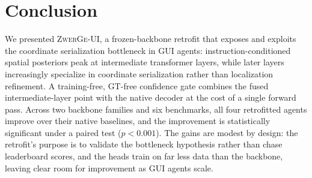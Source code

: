 \section{Conclusion}

We presented \textsc{ZwerGe-UI}, a frozen-backbone retrofit that exposes and exploits the coordinate serialization bottleneck in GUI agents: instruction-conditioned spatial posteriors peak at intermediate transformer layers, while later layers increasingly specialize in coordinate serialization rather than localization refinement.
A training-free, GT-free confidence gate combines the fused intermediate-layer point with the native decoder at the cost of a single forward pass.
Across two backbone families and six benchmarks, all four retrofitted agents improve over their native baselines, and the improvement is statistically significant under a paired test ($p{<}0.001$).
The gains are modest by design: the retrofit's purpose is to validate the bottleneck hypothesis rather than chase leaderboard scores, and the heads train on far less data than the backbone, leaving clear room for improvement as GUI agents scale.
